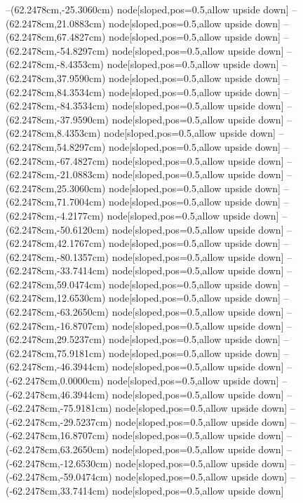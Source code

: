 --(62.2478cm,-25.3060cm) node[sloped,pos=0.5,allow upside down]{\ArrowIn}
--(62.2478cm,21.0883cm) node[sloped,pos=0.5,allow upside down]{\ArrowIn}
--(62.2478cm,67.4827cm) node[sloped,pos=0.5,allow upside down]{\ArrowIn}
--(62.2478cm,-54.8297cm) node[sloped,pos=0.5,allow upside down]{\ArrowIn}
--(62.2478cm,-8.4353cm) node[sloped,pos=0.5,allow upside down]{\ArrowIn}
--(62.2478cm,37.9590cm) node[sloped,pos=0.5,allow upside down]{\ArrowIn}
--(62.2478cm,84.3534cm) node[sloped,pos=0.5,allow upside down]{\ArrowIn}
--(62.2478cm,-84.3534cm) node[sloped,pos=0.5,allow upside down]{\ArrowIn}
--(62.2478cm,-37.9590cm) node[sloped,pos=0.5,allow upside down]{\ArrowIn}
--(62.2478cm,8.4353cm) node[sloped,pos=0.5,allow upside down]{\ArrowIn}
--(62.2478cm,54.8297cm) node[sloped,pos=0.5,allow upside down]{\ArrowIn}
--(62.2478cm,-67.4827cm) node[sloped,pos=0.5,allow upside down]{\ArrowIn}
--(62.2478cm,-21.0883cm) node[sloped,pos=0.5,allow upside down]{\ArrowIn}
--(62.2478cm,25.3060cm) node[sloped,pos=0.5,allow upside down]{\ArrowIn}
--(62.2478cm,71.7004cm) node[sloped,pos=0.5,allow upside down]{\ArrowIn}
--(62.2478cm,-4.2177cm) node[sloped,pos=0.5,allow upside down]{\ArrowIn}
--(62.2478cm,-50.6120cm) node[sloped,pos=0.5,allow upside down]{\ArrowIn}
--(62.2478cm,42.1767cm) node[sloped,pos=0.5,allow upside down]{\ArrowIn}
--(62.2478cm,-80.1357cm) node[sloped,pos=0.5,allow upside down]{\ArrowIn}
--(62.2478cm,-33.7414cm) node[sloped,pos=0.5,allow upside down]{\ArrowIn}
--(62.2478cm,59.0474cm) node[sloped,pos=0.5,allow upside down]{\ArrowIn}
--(62.2478cm,12.6530cm) node[sloped,pos=0.5,allow upside down]{\ArrowIn}
--(62.2478cm,-63.2650cm) node[sloped,pos=0.5,allow upside down]{\ArrowIn}
--(62.2478cm,-16.8707cm) node[sloped,pos=0.5,allow upside down]{\ArrowIn}
--(62.2478cm,29.5237cm) node[sloped,pos=0.5,allow upside down]{\ArrowIn}
--(62.2478cm,75.9181cm) node[sloped,pos=0.5,allow upside down]{\ArrowIn}
--(62.2478cm,-46.3944cm) node[sloped,pos=0.5,allow upside down]{\ArrowIn}
--(-62.2478cm,0.0000cm) node[sloped,pos=0.5,allow upside down]{\ArrowIn}
--(-62.2478cm,46.3944cm) node[sloped,pos=0.5,allow upside down]{\ArrowIn}
--(-62.2478cm,-75.9181cm) node[sloped,pos=0.5,allow upside down]{\ArrowIn}
--(-62.2478cm,-29.5237cm) node[sloped,pos=0.5,allow upside down]{\ArrowIn}
--(-62.2478cm,16.8707cm) node[sloped,pos=0.5,allow upside down]{\ArrowIn}
--(-62.2478cm,63.2650cm) node[sloped,pos=0.5,allow upside down]{\ArrowIn}
--(-62.2478cm,-12.6530cm) node[sloped,pos=0.5,allow upside down]{\ArrowIn}
--(-62.2478cm,-59.0474cm) node[sloped,pos=0.5,allow upside down]{\ArrowIn}
--(-62.2478cm,33.7414cm) node[sloped,pos=0.5,allow upside down]{\ArrowIn}
